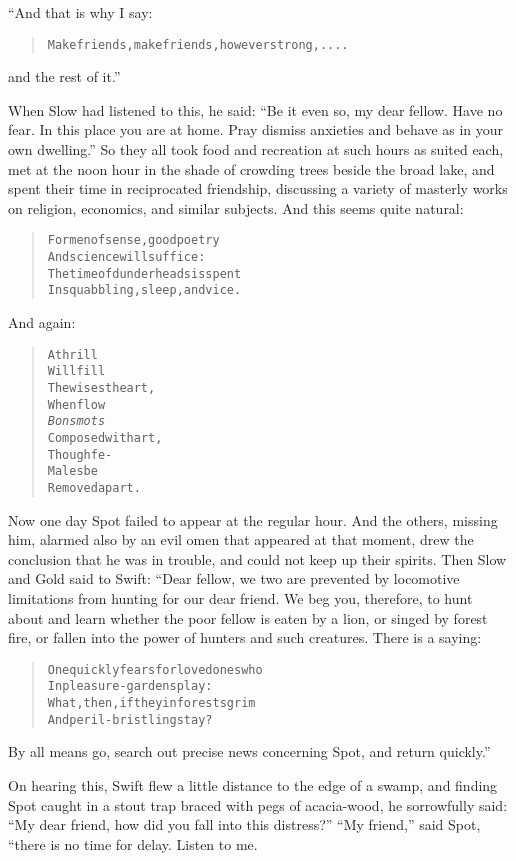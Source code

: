 \documentclass[article, twoside, 14pt]{memoir}
\renewenvironment{verbatim}{%
\begin{quote}%
\vskip -10pt%
\begin{alltt}\normalfont\large}{\end{alltt}%
\end{quote}%
\vskip -10pt
} %
\begin{document}
“And that is why I say:

\begin{verbatim}
Make friends, make friends, however strong, ....
\end{verbatim}
and the rest of it.”

When Slow had listened to this, he said:
``Be it even so, my dear fellow. Have no fear. In this place you are at home. Pray dismiss anxieties and behave as in your own dwelling.''
So they all took food and recreation at such hours as suited each,
met at the noon hour in the shade of crowding trees beside the
broad lake, and spent their time in reciprocated friendship,
discussing a variety of masterly works on religion, economics, and
similar subjects. And this seems quite natural:

\begin{verbatim}
For men of sense, good poetry
    And science will suffice:
The time of dunderheads is spent
    In squabbling, sleep, and vice.
\end{verbatim}
And again:

\begin{verbatim}
A thrill
Will fill
    The wisest heart,
When flow
\emph{Bons mots}
    Composed with art,
Though fe-
Males be
    Removed apart.
\end{verbatim}
Now one day Spot failed to appear at the regular hour. And the
others, missing him, alarmed also by an evil omen that appeared at
that moment, drew the conclusion that he was in trouble, and could
not keep up their spirits. Then Slow and Gold said to Swift: “Dear
fellow, we two are prevented by locomotive limitations from hunting
for our dear friend. We beg you, therefore, to hunt about and learn
whether the poor fellow is eaten by a lion, or singed by forest
fire, or fallen into the power of hunters and such creatures. There
is a saying:

\begin{verbatim}
One quickly fears for loved ones who
    In pleasure-gardens play:
What, then, if they in forests grim
    And peril-bristling stay?
\end{verbatim}
By all means go, search out precise news concerning Spot, and
return quickly.”

On hearing this, Swift flew a little distance to the edge of a
swamp, and finding Spot caught in a stout trap braced with pegs of
acacia-wood, he sorrowfully said:
``My dear friend, how did you fall into this distress?''
``My friend,'' said Spot, “there is no time for delay. Listen to
me.
\end{document}
